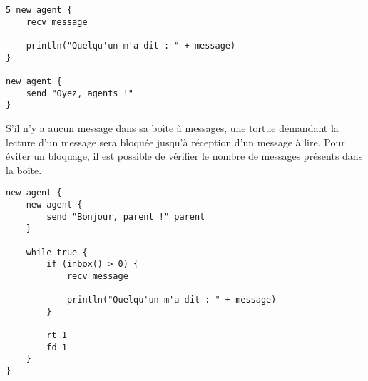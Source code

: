 \begin{lstlisting}[language=Stibbons]
5 new agent {
    recv message

    println("Quelqu'un m'a dit : " + message)
}

new agent {
    send "Oyez, agents !"
}
\end{lstlisting}

S'il n'y a aucun message dans sa boîte à messages, une tortue demandant la lecture d'un message sera bloquée jusqu'à réception d'un message à lire. Pour éviter un bloquage, il est possible de vérifier le nombre de messages présents dans la boîte.

\begin{lstlisting}[language=Stibbons]
new agent {
    new agent {
        send "Bonjour, parent !" parent
    }

    while true {
        if (inbox() > 0) {
            recv message

            println("Quelqu'un m'a dit : " + message)
        }

        rt 1
        fd 1
    }
}
\end{lstlisting}

